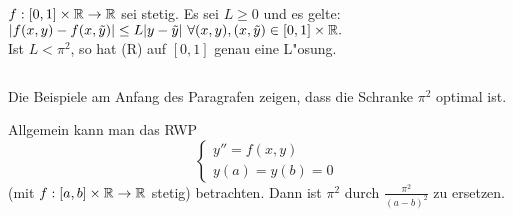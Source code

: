 \documentclass[a4paper,twoside,DIV15,BCOR12mm]{scrbook}
\begin{document}
\begin{satz}
$f:[0,1]\times \mathbb{R} \to \mathbb{R}$ sei stetig. Es sei $L \ge 0$ und es gelte:\\
$|f(x,y)-f(x,\tilde y)|\le L|y-\tilde y|\ \forall(x,y),(x,\tilde y) \in [0,1] \times \MdR.$\\
Ist $L < \pi^2$, so hat (R) auf $[0,1]$ genau eine L"osung.
\end{satz}
\begin{bemerkung}$\ $
  \begin{liste}
   \item Die Beispiele am Anfang des Paragrafen zeigen, dass die Schranke $\pi^2$ optimal ist.
   \item Allgemein kann man das RWP 
    \[ \quad 
      \begin{cases}
        y''=f(x,y)\\
	y(a)=y(b)=0
      \end{cases}
    \]
    (mit $f:[a,b]\times\mathbb{R}\to\mathbb{R}$ stetig) betrachten. Dann ist $\pi^2$ durch $\frac{\pi^2}{(a-b)^2}$ zu ersetzen.
  \end{liste}
\end{bemerkung}
\end{document}
